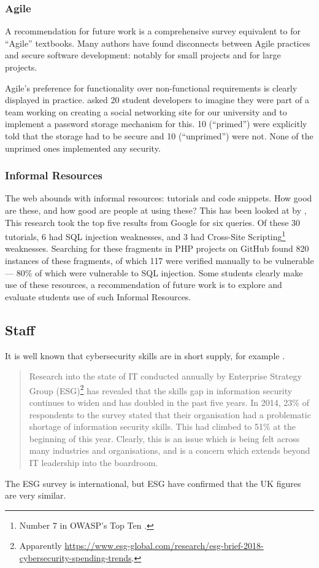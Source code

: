 \documentclass[conference]{IEEEtran}
\begin{document}
\subsubsection{Agile}
A recommendation for future work is a comprehensive survey equivalent to \cite{Drop2019} for ``Agile'' textbooks. Many authors have found disconnects between Agile practices and secure software development: notably \cite{Bartsch2011a} for small projects and \cite{vanderHeijden:2018:EPS:3239235.3267426} for large projects.
\par
Agile's preference for functionality over non-functional requirements is clearly displayed in practice. \cite{Naiakshinaetal2017a} asked 20 student developers to imagine they
were part of a team working on creating a social networking site for
our university and to implement a password storage mechanism for this. 10 (``primed'') were explicitly told that the storage had to be secure and 10 (``unprimed'') were not. None of the unprimed ones implemented any security.
\subsubsection{Informal Resources}\label{sec:informal}
The web abounds with informal resources: tutorials and code snippets. How good are these, and how good are people at using these? This has been looked at by \cite{Unruhetal2017a}, This research took the top five results from Google for six queries. Of these 30 tutorials, 6 had SQL injection weaknesses, and 3 had Cross-Site Scripting\footnote{Number 7 in OWASP's Top Ten \cite{OWASP2017a}.} weaknesses. Searching for these fragments in PHP projects on GitHub found 820 instances of these fragments, of which 117 were verified manually to be vulnerable --- 80\% of which were vulnerable to SQL injection. Some students clearly make use of these resources, a recommendation of future work is to explore and evaluate students use of such Informal Resources. 

\subsection{Staff}
It is well known that cybersecurity skills are in short supply, for example \cite{Page2018a}.
\begin{quote}
Research into the state of IT conducted annually by Enterprise Strategy Group (ESG)\footnote{Apparently \url{https://www.esg-global.com/research/esg-brief-2018-cybersecurity-spending-trends}.} has revealed that the skills gap in information security continues to widen and has doubled in the past five years. In 2014, 23\% of respondents to the survey stated that their organisation had a problematic shortage of information security skills. This had climbed to 51\% at the beginning of this year. Clearly, this is an issue which is being felt across many industries and organisations, and is a concern which extends beyond IT leadership into the boardroom.
\end{quote}
The ESG survey is international, but ESG have confirmed that the UK figures are very similar.
\end{document}
